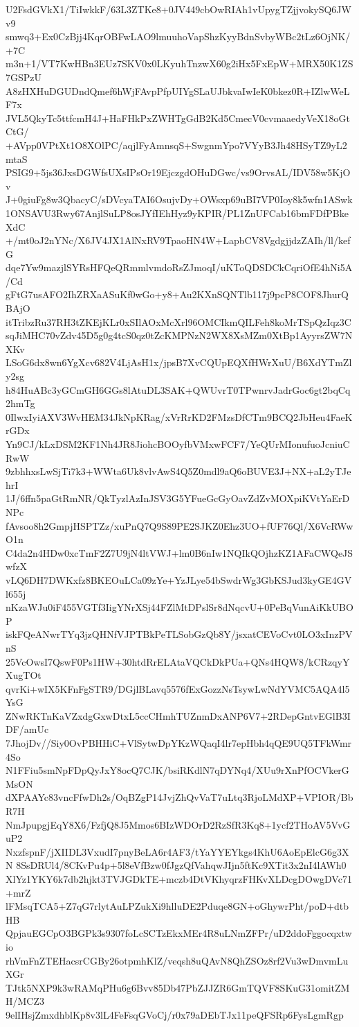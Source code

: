 U2FsdGVkX1/TiIwkkF/63L3ZTKe8+0JV449cbOwRIAh1vUpygTZjjvokySQ6JWv9
smwq3+Ex0CzBjj4KqrOBFwLAO9lmuuhoVapShzKyyBdnSvbyWBc2tLz6OjNK/+7C
m3n+1/VT7KwHBn3EUz7SKV0x0LKyuhTnzwX60g2iHx5FxEpW+MRX50K1ZS7GSPzU
A8zHXHuDGUDndQmef6hWjFAvpPfpUIYgSLaUJbkvaIwIeK0bkez0R+IZlwWeLF7x
JVL5QkyTc5ttfcmH4J+HaFHkPxZWHTgGdB2Kd5CmecV0cvmaaedyVeX18oGtCtG/
+AVpp0VPtXt1O8XOlPC/aqjlFyAmnsqS+SwgnmYpo7VYyB3Jh48HSyTZ9yL2mtaS
PSIG9+5js36JxsDGWfsUXsIPsOr19EjczgdOHuDGwc/vs9OrvsAL/IDV58w5KjOv
J+0giuFg8w3QbacyC/sDVcyaTAI6OsujvDy+OWsxp69uBI7VP0Ioy8k5wfn1ASwk
1ONSAVU3Rwy67AnjlSuLP8osJYfIEhHyz9yKPIR/PL1ZnUFCab16bmFDfPBkeXdC
+/mt0oJ2nYNc/X6JV4JX1AlNxRV9TpaoHN4W+LapbCV8VgdgjjdzZAIh/ll/kefG
dqe7Yw9mazjlSYRsHFQeQRmmlvmdoRsZJmoqI/uKToQDSDCkCqriOfE4hNi5A/Cd
gFtG7usAFO2IhZRXaASuKf0wGo+y8+Au2KXnSQNTlb117j9pcP8COF8JhurQBAjO
itTribzRu37RH3tZKEjKLr0xSIlAOxMcXrl96OMCIkmQILFeh8koMrTSpQzIqz3C
sqJiMHC70vZdv45D5g0g4tcS0qz0tZcKMPNzN2WX8XsMZm0XtBp1AyyrsZW7NXKv
LSoG6dx8wn6YgXcv682V4LjAsH1x/jpsB7XvCQUpEQXfHWrXuU/B6XdYTmZly2sg
h84HuABc3yGCmGH6GGs8lAtuDL3SAK+QWUvrT0TPwnrvJadrGoc6gt2bqCq2hmTg
0IlwxIyiAXV3WvHEM34JkNpKRag/xVrRrKD2FMzsDfCTm9BCQ2JbHeu4FaeKrGDx
Yn9CJ/kLxDSM2KF1Nh4JR8JiohcBOOyfbVMxwFCF7/YeQUrMIonufuoJcniuCRwW
9zbhhxsLwSjTi7k3+WWta6Uk8vlvAwS4Q5Z0mdl9aQ6oBUVE3J+NX+aL2yTJehrI
1J/6ffn5paGtRmNR/QkTyzlAzInJSV3G5YFueGcGyOavZdZvMOXpiKVtYaErDNPc
fAvsoo8h2GmpjHSPTZz/xuPnQ7Q9S89PE2SJKZ0Ehz3UO+fUF76Ql/X6VcRWwO1n
C4da2n4HDw0xcTmF2Z7U9jN4ltVWJ+lm0B6nIw1NQIkQOjhzKZ1AFaCWQeJSwfzX
vLQ6DH7DWKxfz8BKEOuLCa09zYe+YzJLye54bSwdrWg3GbKSJud3kyGE4GVl655j
nKzaWJu0iF455VGTf3IigYNrXSj44FZlMtDPslSr8dNqcvU+0PeBqVunAiKkUBOP
iskFQeANwrTYq3jzQHNfVJPTBkPeTLSobGzQb8Y/jsxatCEVoCvt0LO3xInzPVnS
25VcOwsI7QswF0Ps1HW+30htdRrELAtaVQCkDkPUa+QNs4HQW8/kCRzqyYXugTOt
qvrKi+wIX5KFnFgSTR9/DGjlBLavq5576fExGozzNsTsywLwNdYVMC5AQA4l5YsG
ZNwRKTnKaVZxdgGxwDtxL5ccCHmhTUZnmDxANP6V7+2RDepGntvEGlB3IDF/amUc
7JhojDv//Siy0OvPBHHiC+VlSytwDpYKzWQaqI4lr7epHbh4qQE9UQ5TFkWmr4So
N1FFiu5smNpFDpQyJxY8ocQ7CJK/bsiRKdlN7qDYNq4/XUu9rXnPfOCVkerGMsON
dXPAAYc83vncFfwDh2s/OqBZgP14JvjZhQvVaT7uLtq3RjoLMdXP+VPIOR/BbR7H
NmJpupgjEqY8X6/FzfjQ8J5Mmos6BIzWDOrD2RzSfR3Kq8+1ycf2THoAV5VvGuP2
NxzfspnF/jXIIDL3VxudI7pnyBeLA6r4AF3/tYaYYEYkgs4KhU6AoEpElcG6g3XN
8SsDRUl4/8CKvPu4p+5l8eVfBzw0fJgzQfVahqwJIjn5ftKc9XTit3x2nI4lAWh0
XlYz1YKY6k7db2hjkt3TVJGDkTE+mczb4DtVKhyqrzFHKvXLDcgDOwgDVc71+mrZ
lFMsqTCA5+Z7qG7rlytAuLPZukXi9hlluDE2Pduqe8GN+oGhywrPht/poD+dtbHB
QpjauEGCpO3BGPk3s9307foLcSCTzEkxMEr4R8uLNmZFPr/uD2ddoFggocqxtwio
rhVmFnZTEHacsrCGBy26otpmhKlZ/veqsh8uQAvN8QhZSOz8rf2Vu3wDmvmLuXGr
TJtk5NXP9k3wRAMqPHu6g6Bvv85Db47PbZJJZR6GmTQVF8SKuG31omitZMH/MCZ3
9elIHsjZmxdhblKp8v3lL4FeFsqGVoCj/r0x79aDEbTJx11peQFSRp6FysLgmRgp

